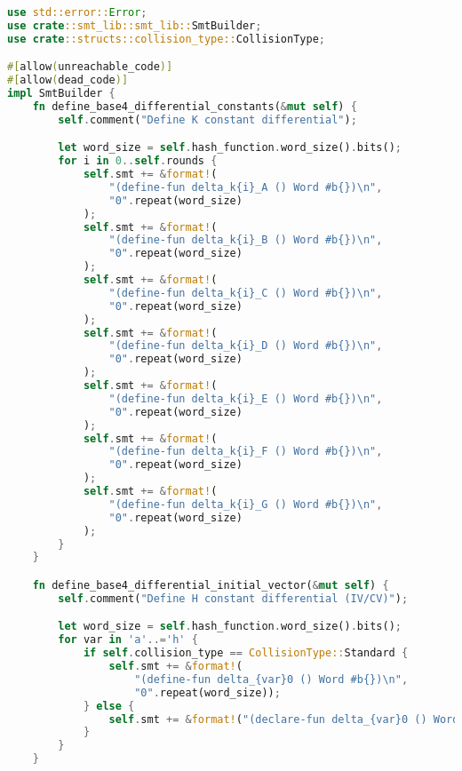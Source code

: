 \begin{lstlisting}[language=rust, caption={smt\_lib/encodings/base4.rs}]
use std::error::Error;
use crate::smt_lib::smt_lib::SmtBuilder;
use crate::structs::collision_type::CollisionType;

#[allow(unreachable_code)]
#[allow(dead_code)]
impl SmtBuilder {
	fn define_base4_differential_constants(&mut self) {
		self.comment("Define K constant differential");

		let word_size = self.hash_function.word_size().bits();
		for i in 0..self.rounds {
			self.smt += &format!(
				"(define-fun delta_k{i}_A () Word #b{})\n",
				"0".repeat(word_size)
			);
			self.smt += &format!(
				"(define-fun delta_k{i}_B () Word #b{})\n",
				"0".repeat(word_size)
			);
			self.smt += &format!(
				"(define-fun delta_k{i}_C () Word #b{})\n",
				"0".repeat(word_size)
			);
			self.smt += &format!(
				"(define-fun delta_k{i}_D () Word #b{})\n",
				"0".repeat(word_size)
			);
			self.smt += &format!(
				"(define-fun delta_k{i}_E () Word #b{})\n",
				"0".repeat(word_size)
			);
			self.smt += &format!(
				"(define-fun delta_k{i}_F () Word #b{})\n",
				"0".repeat(word_size)
			);
			self.smt += &format!(
				"(define-fun delta_k{i}_G () Word #b{})\n",
				"0".repeat(word_size)
			);
		}
	}

	fn define_base4_differential_initial_vector(&mut self) {
		self.comment("Define H constant differential (IV/CV)");

		let word_size = self.hash_function.word_size().bits();
		for var in 'a'..='h' {
			if self.collision_type == CollisionType::Standard {
				self.smt += &format!(
					"(define-fun delta_{var}0 () Word #b{})\n",
					"0".repeat(word_size));
			} else {
				self.smt += &format!("(declare-fun delta_{var}0 () Word)\n");
			}
		}
	}


\end{lstlisting}
